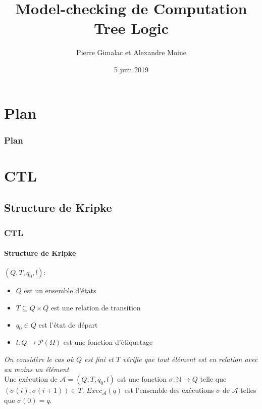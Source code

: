 \documentclass[11pt]{beamer}
\author{Pierre Gimalac et Alexandre Moine}
\begin{document}
\title{Model-checking de Computation Tree Logic}
\date{5 juin 2019}

\begin{frame}[plain]
	\maketitle
\end{frame}

\section*{Plan}

\begin{frame}
	\frametitle{Plan}
	\tableofcontents[]
\end{frame}

\section{CTL}
\subsection{Structure de Kripke}
\begin{frame}
    \frametitle{CTL}
    \framesubtitle{Structure de Kripke}

    $(Q,T, q_0, l)$:
    \begin{itemize}
    \item $Q$ est un ensemble d'états
    \item $T \subseteq Q \times Q$ est une relation de transition
    \item $q_0 \in Q$ est l'état de départ
    \item $l : Q \to \mathcal{P}(\Omega)$ est une fonction d'étiquetage
    \end{itemize}

    \pause
    \bigskip
    \textit{On considère le cas où $Q$ est fini et $T$ vérifie que tout élément est en relation avec au moins un élément}\\
    \pause
    \bigskip
    Une exécution de $\mathcal{A} = (Q, T, q_0, l)$ est une fonction $\sigma : \mathbb{N} \to Q$ telle que $(\sigma(i), \sigma(i+1))\in T$. $Exec_\mathcal{A}(q)$ est l'ensemble des exécutions $\sigma$ de $\mathcal{A}$ telles que $\sigma(0) = q$.
\end{frame}
\end{document}
